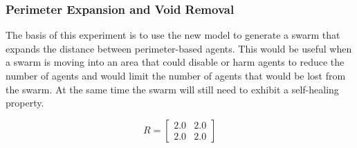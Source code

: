 \documentclass[12pt,a4paper]{IEEEtran}
\newcommand{\rb}{\mathit{R}}
\begin{document}




\subsubsection{Perimeter Expansion and Void Removal}
The basis of this experiment is to use the new model to generate a swarm that expands the distance between perimeter-based agents. This would be useful when a swarm is moving into an area that could disable or harm agents to reduce the number of agents and would limit the number of agents that would be lost from the swarm. At the same time the swarm will still need to exhibit a self-healing property.

\begin{equation}\label{eq:rbexp2}
\rb = 
\begin{bmatrix}
2.0 & 2.0\\
2.0 & 2.0
\end{bmatrix}
\end{equation}
\end{document}

